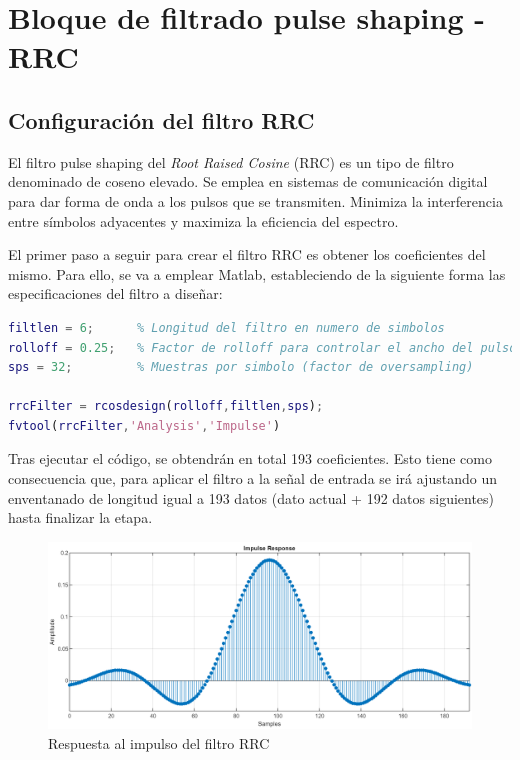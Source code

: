 \pagebreak

\vspace{3mm}

\section{Bloque de filtrado pulse shaping - RRC}

\subsection{Configuración del filtro RRC}

El filtro pulse shaping del \textit{Root Raised Cosine} (RRC) es un tipo de filtro denominado de coseno elevado. Se emplea en sistemas de comunicación digital para dar forma de onda a los pulsos que se transmiten. Minimiza la interferencia entre símbolos adyacentes y maximiza la eficiencia del espectro.

El primer paso a seguir para crear el filtro RRC es obtener los coeficientes del mismo. Para ello, se va a emplear Matlab, estableciendo de la siguiente forma las especificaciones del filtro a diseñar:

\vspace{5mm}

\begin{lstlisting}[language=matlab, style=mystyle, caption={Diseño del filtro RRC en Matlab}]
filtlen = 6;      % Longitud del filtro en numero de simbolos
rolloff = 0.25;   % Factor de rolloff para controlar el ancho del pulso
sps = 32;         % Muestras por simbolo (factor de oversampling)

rrcFilter = rcosdesign(rolloff,filtlen,sps);
fvtool(rrcFilter,'Analysis','Impulse')
\end{lstlisting}

\vspace{3mm}

Tras ejecutar el código, se obtendrán en total 193 coeficientes. Esto tiene como consecuencia que, para aplicar el filtro a la señal de entrada se irá ajustando un enventanado de longitud igual a 193 datos (dato actual + 192 datos siguientes) hasta finalizar la etapa. 

\vspace{3mm}

\begin{figure}[h]
	\centering
	\includegraphics[width=1\textwidth]{img/matlab/rrc.PNG}
	\caption{Respuesta al impulso del filtro RRC}
	\label{fig:fvtool}
\end{figure}
    
